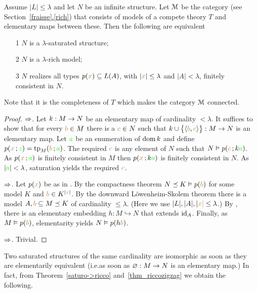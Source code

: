 \documentclass[creche.tex]{subfiles}
\begin{document}
\begin{theorem}\label{saturo->ricco}
Assume $|L|\le\lambda$ and let $N$ be an infinite structure. Let $\EuScript M$ be the category (see Section~\hyperref[rich]{\ref*{fraisse}.\ref*{rich}}) that consists of models of a compete theory $T$ and elementary maps between these. Then the following are equivalent
\begin{itemize}
\item[1] $N$ is a $\lambda$-saturated structure;
\item[2] $N$ is a $\lambda$-rich model;
\item[3] $N$ realizes all types $p({\color{brown} x})\subseteq L(A)$, with $|{\color{brown} x}|\le\lambda$ and $|A|<\lambda$, finitely consistent in $N$.
\end{itemize}
\end{theorem}

Note that it is the completeness of $T$ which makes the category $\EuScript M$ connected.

\begin{proof}
$\Rightarrow$. Let $k:M\rightarrow N$ be an elementary map of cardinality $<\lambda$. It suffices to show that for every ${\color{brown} b}\in M$ there is a ${\color{brown} c}\in N$ such that $k\cup\big\{\langle{\color{brown}b},{\color{brown} c}\rangle\big\}:M\to N$ is an elementary map. Let ${\color{green} a}$ be an enumeration of $\mathop{\rm dom} k$ and define $p({\color{brown} x}\,;{\color{green} z})={\rm tp}_M({\color{brown} b}\,;{\color{green} a})$. The required ${\color{brown} c}$ is any element of $N$ such that $N\vDash p({\color{brown} c}\,;k{\color{green} a})$. As $p({\color{brown} x}\,;{\color{green} a})$ is finitely consistent in $M$ then $p({\color{brown} x}\,;k{\color{green} a})$ is finitely consistent in $N$. As $|{\color{green} a}|<\lambda$, saturation yields the required ${\color{brown} c}$.

$\Rightarrow$. Let $p({\color{brown} x})$ be as in . By the compactness theorem $N\preceq K\vDash p({\color{brown} b})$ for some model $K$ and ${\color{brown} b}\in K^{|{\color{brown} x}|}$. By the downward  L\"owenheim-Skolem theorem there is a model $A,{\color{brown} b}\subseteq M\preceq K$ of cardinality $\le\lambda$. (Here we use $|L|,|A|,|{\color{brown} x|}\le\lambda$.) By , there is an elementary embedding $h:M\hookrightarrow N$ that extends $\textrm{id}_A$. Finally, as $M\vDash p({\color{brown} b})$,  elementarity yields $N\vDash p(h{\color{brown} b})$.

$\Rightarrow$.  Trivial. 
\end{proof}

Two saturated structures of the same cardinality are isomorphic as soon as they are elementarily equivalent (i.e.\@ as soon as $\varnothing:M\to N$ is an elementary map.) In fact, from Theorem~\ref{saturo->ricco} and~\ref{thm_riccozigzag} we obtain the following.
\end{document}
